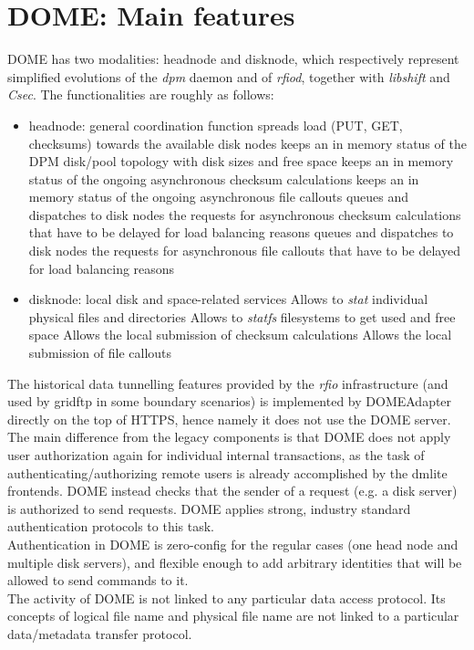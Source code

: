 \documentclass[a4paper]{jpconf}
\begin{document}
\section{DOME: Main features}
DOME has two modalities: headnode and disknode, which respectively represent
simplified evolutions of the \textit{dpm} daemon and of \textit{rfiod}, together with \textit{libshift} and \textit{Csec}.
The functionalities are roughly as follows:
\begin{itemize}
 \item headnode: general coordination function
 \subitem spreads load (PUT, GET, checksums) towards the available disk nodes
 \subitem keeps an in memory status of the DPM disk/pool topology with disk sizes and free space
 \subitem keeps an in memory status of the ongoing asynchronous checksum calculations
 \subitem keeps an in memory status of the ongoing asynchronous file callouts
 \subitem queues and dispatches to disk nodes the requests for asynchronous checksum calculations that have to be delayed for load balancing reasons
 \subitem queues and dispatches to disk nodes the requests for asynchronous file callouts that have to be delayed for load balancing reasons

 \item disknode: local disk and space-related services
 \subitem Allows to \textit{stat} individual physical files and directories
 \subitem Allows to \textit{statfs} filesystems to get used and free space
 \subitem Allows the local submission of checksum calculations
 \subitem Allows the local submission of file callouts
\end{itemize}

The historical data tunnelling features provided by the \textit{rfio} infrastructure (and used by gridftp in some boundary scenarios) \cite{BIB}
is implemented by DOMEAdapter directly on the top of HTTPS, hence namely it does not use the DOME server.\\

The main difference from the legacy components is that DOME does not apply user authorization again for individual internal
transactions, as the task of authenticating/authorizing remote users is already accomplished by the dmlite frontends.
DOME instead checks that the sender of a request (e.g. a disk server) is authorized to
send requests. DOME applies strong, industry standard authentication protocols to this task.\\
Authentication in DOME is zero-config for the regular cases (one head node and multiple disk servers), and flexible enough
to add arbitrary identities that will be allowed to send commands to it.\\
The activity of DOME is not linked to any particular data access protocol. Its concepts of logical file name and physical file name are not linked to a particular data/metadata transfer protocol.
\end{document}
